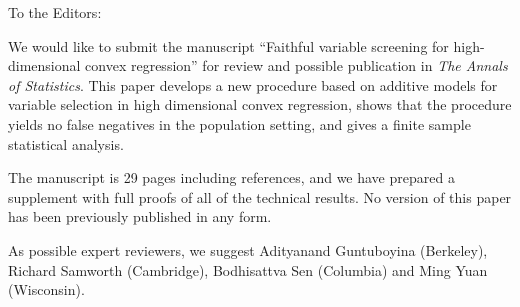 \documentclass[12pt]{article}
\begin{document}
\thispagestyle{empty}
\myletterhead{}
\date{}
\vskip15pt

To the Editors:

We would like to submit the manuscript ``Faithful variable screening
for high-dimensional convex regression'' for review and possible
publication in {\it The Annals of Statistics}.  This paper develops a
new procedure based on additive models for variable selection in high
dimensional convex regression, shows that the procedure yields no
false negatives in the population setting, and gives a finite sample
statistical analysis.

The manuscript is 29 pages including references, and we have
prepared a supplement with full proofs of all of the technical
results.  No version of this paper has been previously
published in any form.

As possible expert reviewers, we suggest Adityanand Guntuboyina
(Berkeley), Richard Samworth (Cambridge), Bodhisattva Sen (Columbia)
and Ming Yuan (Wisconsin).

\jdlucsig{}
\end{document}
